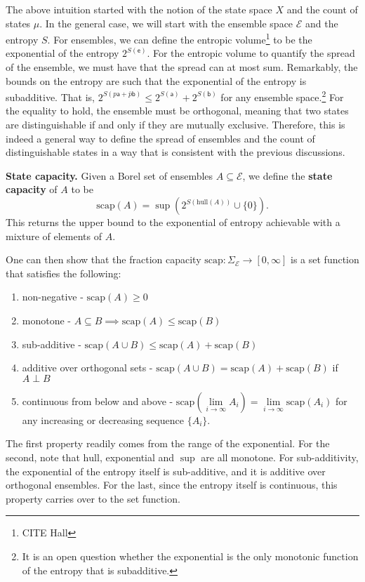 \documentclass[10pt,twocolumn, nofootinbib]{revtex4-2}
\newcommand\hull{\mathrm{hull}}
\newcommand\capacity{\mathrm{scap}}
\newcommand{\ens}[1][e] {\mathsf{#1}} %
\newcommand{\Ens}[1][E] {\mathcal{#1}} %
\def\ortho{\perp}
\begin{document}
The above intuition started with the notion of the state space $X$ and the count of states $\mu$. In the general case, we will start with the ensemble space $\Ens$ and the entropy $S$. For ensembles, we can define the entropic volume\footnote{CITE Hall} to be the exponential of the entropy $2^{S(\ens)}$. For the entropic volume to quantify the spread of the ensemble, we must have that the spread can at most sum. Remarkably, the bounds on the entropy are such that the exponential of the entropy is subadditive. That is, $2^{S(p\ens[a]+\bar{p}\ens[b])} \leq 2^{S(\ens[a])} + 2^{S(\ens[b])}$ for any ensemble space.\footnote{It is an open question whether the exponential is the only monotonic function of the entropy that is subadditive.} For the equality to hold, the ensemble must be orthogonal, meaning that two states are distinguishable if and only if they are mutually exclusive. Therefore, this is indeed a general way to define the spread of ensembles and the count of distinguishable states in a way that is consistent with the previous discussions.

\textbf{State capacity.} Given a Borel set of ensembles $A \subseteq \Ens$, we define the \textbf{state capacity} of $A$ to be
\begin{equation}
\capacity(A) = \sup(2^{S(\hull(A))}\cup\{0\}).
\end{equation}
This returns the upper bound to the exponential of entropy achievable with a mixture of elements of $A$.

One can then show that the fraction capacity $\capacity : \Sigma_{\Ens} \to [0,\infty]$ is a set function that satisfies the following:
\begin{enumerate}
	\item non-negative - $\capacity(A)\geq 0$
	\item monotone - $A \subseteq B \implies \capacity(A) \leq \capacity(B)$
	\item sub-additive - $\capacity(A \cup B) \leq \capacity(A) + \capacity(B)$
	\item additive over orthogonal sets - $\capacity(A \cup B) = \capacity(A) + \capacity(B)$ if $A \ortho B$
	\item continuous from below and above - $\capacity(\lim\limits_{i \to \infty} A_i) = \lim\limits_{i \to \infty} \capacity(A_i)$ for any increasing or decreasing sequence $\{A_i\}$.
\end{enumerate}

The first property readily comes from the range of the exponential. For the second, note that $\hull$, exponential and $\sup$ are all monotone. For sub-additivity, the exponential of the entropy itself is sub-additive, and it is additive over orthogonal ensembles. For the last, since the entropy itself  is continuous, this property carries over to the set function.
\end{document}
